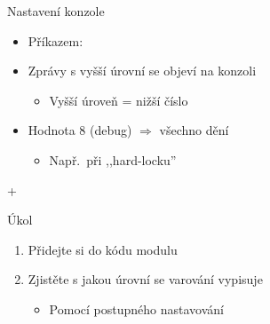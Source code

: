 \begin{frame}{Nastavení konzole}

  \begin{itemize}
    \item Příkazem: 

    \pause

    \item Zprávy s vyšší úrovní se objeví na konzoli
    \begin{itemize}
      \item Vyšší úroveň = nižší číslo
    \end{itemize}

    \pause

    \item Hodnota 8 (debug) $\Rightarrow$ všechno dění
    \begin{itemize}
      \item Např.\ při ,,hard-locku''
    \end{itemize}
  \end{itemize}

  \medskip
  \pause

    + 

\end{frame}

\iffimuni

\begin{frame}{Úkol}

    \begin{enumerate}
    \item Přidejte si do kódu modulu 
    \item Zjistěte s jakou úrovní se varování vypisuje
    \begin{itemize}
      \item Pomocí postupného nastavování 
    \end{itemize}
  \end{enumerate}

\end{frame}

\fi

